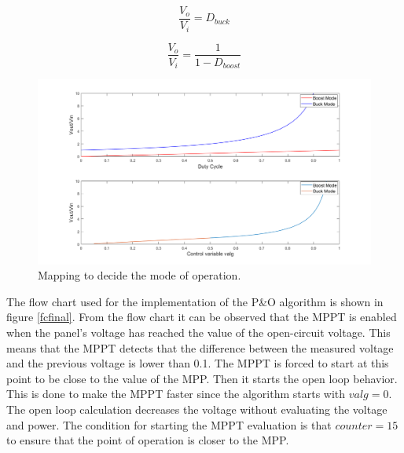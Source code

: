 \vspace{1cm}
\begin{minipage}{0.3\linewidth}
	\begin{equation}	\label{tfbuck}
	\frac{V_o}{V_i} = D_{buck}
	\end{equation}

\end{minipage}%
\begin{minipage}{0.5\linewidth}	
	\begin{equation}	\label{tfboost}
	\frac{V_o}{V_i}= \frac{1}{1-D_{boost}}
	\end{equation}

\end{minipage}

\begin{figure}[H]
	\begin{center}
		\includegraphics[width=1\textwidth]{../Pictures/decision_mode_operation}
		\caption{Mapping to decide the mode of operation.}
		\label{fig:mappingtf} 
	\end{center}	
\end{figure}

The flow chart used for the implementation of the P\&O algorithm is shown in figure \ref{fcfinal}. From the flow chart it can be observed that the MPPT is enabled when the panel's voltage has reached the value of the open-circuit voltage. This means that the MPPT detects that the difference between the measured voltage and the previous voltage is lower than 0.1. The MPPT is forced to start at this point to be close to the value of the MPP. 
Then it starts the open loop behavior. This is done to make the MPPT faster since the algorithm starts with $valg = 0$. The open loop calculation decreases the voltage without evaluating the voltage and power. The condition for starting the MPPT evaluation is that $counter=15$ to ensure that the point of operation is closer to the MPP. 

